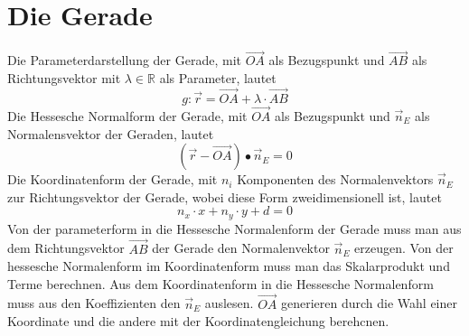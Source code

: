 \section{Die Gerade}
Die Parameterdarstellung der Gerade, mit $\overrightarrow{OA}$ als Bezugspunkt und $\overrightarrow{AB}$ als Richtungsvektor mit $\lambda\in \mathbb{R}$ als Parameter, lautet
\begin{equation}
\boxed{g:\overrightarrow{r}=\overrightarrow{OA}+\lambda\cdot \overrightarrow{AB}}
\end{equation}
Die Hessesche Normalform der Gerade, mit $\overrightarrow{OA}$ als Bezugspunkt und $\overrightarrow{n}_E$ als Normalensvektor der Geraden, lautet
\begin{equation}
\boxed{\left(\overrightarrow{r}-\overrightarrow{OA}\right)\bullet \overrightarrow{n}_E=0}
\end{equation}
Die Koordinatenform der Gerade, mit $n_i$ Komponenten des Normalenvektors $\overrightarrow{n}_E$ zur Richtungsvektor der Gerade, wobei diese Form zweidimensionell ist, lautet
\begin{equation}
\boxed{n_x\cdot x+n_y\cdot y+d=0}
\end{equation}
Von der parameterform in die Hessesche Normalenform der Gerade muss man aus dem Richtungsvektor $\overrightarrow{AB}$ der Gerade den Normalenvektor $\overrightarrow{n}_E$ erzeugen.\newline\newline
Von der hessesche Normalenform im Koordinatenform muss man das Skalarprodukt und Terme berechnen. 
\newline\newline
Aus dem Koordinatenform in die Hessesche Normalenform muss aus den Koeffizienten den $\overrightarrow{n}_E$ auslesen. $\overrightarrow{OA}$ generieren durch die Wahl einer Koordinate und die andere mit der Koordinatengleichung berehcnen. 
